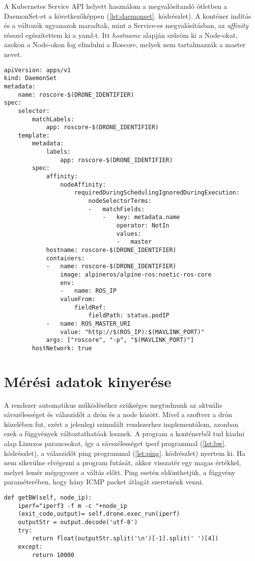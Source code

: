 \noindent
A Kubernetes Service API helyett használom a megvalósítandó ötletben a DaemonSet-et a következőképpen (\ref{lst:daemonset}. kódrészlet). A konténer indítás és a változók ugyanazok maradtak, mint a Service-es megvalósításban, az \emph{affinity} résszel egészítettem ki a yaml-t. Itt \emph{hostname} alapján szűröm ki a Node-okat, azokon a Node-okon fog elindulni a Roscore, melyek nem tartalmazzák a master nevet.

\begin{lstlisting}[caption={DaemonSet megvalósítás, Roscore minden worker-en}, label={lst:daemonset}]
apiVersion: apps/v1
kind: DaemonSet
metadata:
	name: roscore-$(DRONE_IDENTIFIER)
spec:
	selector:
		matchLabels:
			app: roscore-$(DRONE_IDENTIFIER)
	template:
		metadata:
			labels:
				app: roscore-$(DRONE_IDENTIFIER)
		spec:
			affinity:
				nodeAffinity:
					requiredDuringSchedulingIgnoredDuringExecution:
						nodeSelectorTerms:
						-	matchFields:
							-	key: metadata.name
								operator: NotIn
								values:
								-	master
			hostname: roscore-$(DRONE_IDENTIFIER)
			containers:
			-	name: roscore-$(DRONE_IDENTIFIER)
				image: alpineros/alpine-ros:noetic-ros-core 
				env:
				-	name: ROS_IP
				valueFrom:
					fieldRef:
						fieldPath: status.podIP
			-	name: ROS_MASTER_URI
				value: "http://$(ROS_IP):$(MAVLINK_PORT)"
			args: ["roscore", "-p", "$(MAVLINK_PORT)"]
		hostNetwork: true
\end{lstlisting}

\section{Mérési adatok kinyerése}
A rendszer automatikus működéséhez szükséges megtudnunk az aktuális sávszélességet és válaszidőt a drón és a node között. Mivel a szoftver a drón közelében fut, ezért a jelenlegi szimulált rendszerhez implementálom, azonban ezek a függvények változtathatóak lesznek. A program a konténerből tud kiadni alap Linuxos parancsokat, így a sávszélességet iperf programmal (\ref{lst:bw}. kódrészlet), a válaszidőt ping programmal (\ref{lst:ping}. kódrészlet)  nyertem ki. Ha nem sikerülne elvégezni a program futását, akkor visszatér egy magas értékkel, melyet lemér mégegyszer a váltás előtt. Ping esetén eldönthetjük, a függvény paraméterében, hogy hány ICMP packet átlagát szeretnénk venni.

\begin{lstlisting}[caption={Sávszélesség megállapítása a konténer és a node között}, label={lst:bw}]
def getBW(self, node_ip):
	iperf="iperf3 -f m -c "+node_ip
	(exit_code,output)= self.drone.exec_run(iperf)
	outputStr = output.decode('utf-8')
	try:
		return float(outputStr.split('\n')[-1].split(' ')[4])
	except:
		return 10000
\end{lstlisting}

